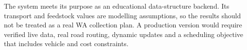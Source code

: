 \documentclass[10pt,a4paper]{article}
\begin{document}
The system meets its purpose as an educational data-structure backend. Its transport and feedstock values are modelling assumptions, so the results should not be treated as a real WA collection plan. A production version would require verified live data, real road routing, dynamic updates and a scheduling objective that includes vehicle and cost constraints.

{}


\end{document}
